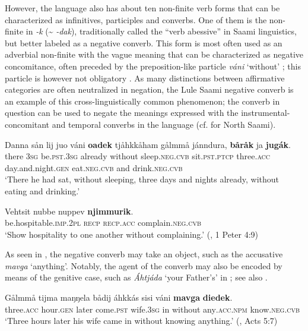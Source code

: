 \documentclass[output=paper,colorlinks,citecolor=brown]{langscibook}
\begin{document}
However, the language also has about ten non-finite verb forms that can be characterized as infinitives, participles and converbs. One of them is the non-finite in \textit{{}-k} ({\textasciitilde} \textit{{}-dak}), traditionally called the “verb abessive” in Saami linguistics, but better labeled as a negative converb. This form is most often used as an adverbial non-finite with the vague meaning that can be characterized as negative concomitance, often preceded by the preposition-like particle \textit{váni} ‘without’ ; this particle is however not obligatory . As many distinctions between affirmative categories are often neutralized in negation, the Lule Saami negative converb is an example of this cross-linguistically common phenomenon; the converb in question can be used to negate the meanings expressed with the instrumental-concomitant and temporal converbs in the language (cf. \citealt[38ff.]{Ylikoski2009} for North Saami).

\ea\label{ex:lul:26} 
    \gll Danna sån lij juo váni \textbf{oadek} tjåhkkåham gålmmå jánndura, \textbf{båråk} ja \textbf{jugák}.\\ 
         there \textsc{3sg} be.\textsc{pst}.\textsc{3sg} already without sleep.\textsc{neg.cvb} sit.\textsc{pst.ptcp} three.\textsc{acc} day.and.night.\textsc{gen} eat.\textsc{neg.cvb} and drink.\textsc{neg.cvb} \\
    \glt  ‘There he had sat, without sleeping, three days and nights already, without eating and drinking.’ \citep{SIKOR2021}
\z 

\ea\label{ex:lul:27} 
    \gll Vehtsit nubbe nuppev \textbf{njimmurik}. \\ 
         be.hospitable.\textsc{imp.2pl} \textsc{recp} \textsc{recp.acc} complain.\textsc{neg.cvb} \\
    \glt ‘Show hospitality to one another without complaining.’ (\citealt{SIKOR2021}, 1 Peter 4:9)
\z 

As seen in , the negative converb may take an object, such as the accusative \textit{mavga} ‘anything’. Notably, the agent of the converb may also be encoded by means of the genitive case, such as \textit{Áhtjáda} ‘your Father’s’ in ; see also \citet[110]{Spiik1989}.

\ea\label{ex:lul:28} 
    \gll Gålmmå tijma maŋŋela bådij áhkkás sisi váni \textbf{mavga} \textbf{diedek}. \\ 
         three.\textsc{acc} hour.\textsc{gen} later come.\textsc{pst} wife.\textsc{3sg} in without any\textsc{.acc.npm} know\textsc{.neg.cvb}\\
    \glt  ‘Three hours later his wife came in without knowing anything.’ (\citealt{SIKOR2021}, Acts 5:7)
\z 
\end{document}
